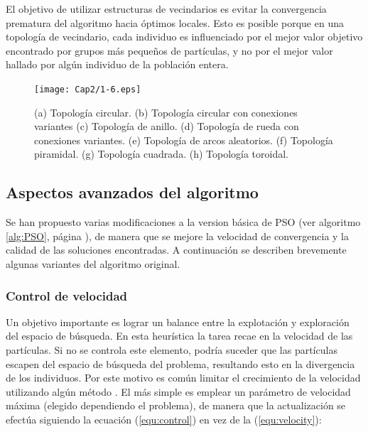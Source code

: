   El objetivo de utilizar estructuras de vecindarios es evitar la convergencia prematura del algoritmo hacia \'optimos locales. Esto es posible 
  porque en una topolog\'ia de vecindario, cada individuo es influenciado por el mejor valor objetivo encontrado por grupos m\'as peque\~nos de 
  part\'iculas, y no por el mejor valor hallado por alg\'un individuo de la poblaci\'on entera.

    \begin{figure}
	\centering
	\texttt{[image: Cap2/1-6.eps]}
	  \caption [Topolog\'ias de Vecindarios]{ (a) Topolog\'ia circular. (b) Topolog\'ia circular con conexiones variantes (c) Topolog\'ia de anillo. (d) Topolog\'ia
	  de rueda con conexiones variantes. (e) Topolog\'ia de arcos aleatorios. (f) Topolog\'ia piramidal. (g) Topolog\'ia cuadrada. 
	  (h) Topolog\'ia toroidal.}
      \label{fig:vecindarios}
      \end{figure}

    \subsection{Aspectos avanzados del algoritmo}

    Se han propuesto varias modificaciones a la version b\'asica de PSO (ver algoritmo \ref{alg:PSO}, p\'agina \pageref{alg:PSO}), de 
    manera que se mejore la velocidad de convergencia y la calidad de las soluciones encontradas. A continuaci\'on se describen brevemente 
    algunas variantes del algoritmo original.

    \subsubsection{Control de velocidad}

    Un objetivo importante es lograr un balance entre la explotaci\'on y exploraci\'on del espacio de b\'usqueda. En esta heur\'istica 
    la tarea recae en la velocidad de las part\'iculas. Si no se controla este elemento, podr\'ia suceder que las part\'iculas escapen 
    del espacio de b\'usqueda del problema, resultando esto en la divergencia de los individuos. Por este motivo es com\'un limitar el 
    crecimiento de la velocidad utilizando alg\'un m\'etodo \cite{Eberhart1996}. El m\'as simple es emplear un par\'ametro de velocidad m\'axima (elegido
    dependiendo el problema), de manera que la actualizaci\'on se efect\'ua  siguiendo la ecuaci\'on (\ref{equ:control}) en vez de la 
    (\ref{equ:velocity}):


